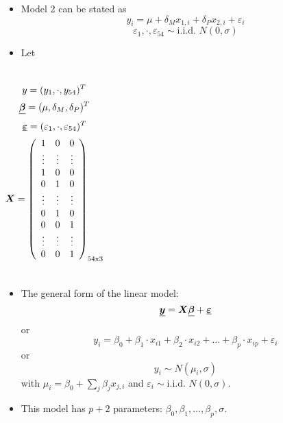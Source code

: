 \begin{frame}
  \begin{itemize}
    \item Model 2 can be stated as
      $$ y_i = \mu + \delta_M x_{1,i} + \delta_P x_{2,i} + \varepsilon_i $$
      $$ \varepsilon_1, \cdot, \varepsilon_{54} \sim \text{i.i.d. } N(0, \sigma) $$
    \item Let
  \end{itemize}
  \vspace{0.25cm}
  \begin{columns}[l]
      \vspace{0.5cm}
      $$ \boldsymbol{\underline{}}y = (y_1, \cdot, y_{54})^T $$
      $$ \boldsymbol{\underline{\beta}} = (\mu, \delta_M, \delta_P)^T $$
      $$ \boldsymbol{\underline{\varepsilon}} = (\varepsilon_1, \cdot, \varepsilon_{54})^T $$
      \vspace{-1cm}   
      $$ 
        \boldsymbol{X} = 
       \left(
          \begin{array}{ccc} 
            1 & 0 & 0 \\
            \vdots & \vdots & \vdots \\
            1 & 0 & 0 \\
            0 & 1 & 0 \\
            \vdots & \vdots & \vdots \\
            0 & 1 & 0 \\
            0 & 0 & 1 \\
            \vdots & \vdots & \vdots \\
            0 & 0 & 1 \\  
          \end{array}
        \right)_{54\text{x}3}
      $$
  \end{columns}
\end{frame}




\begin{frame}
  \begin{itemize}
    \vspace{0.5cm}
    \item The general form of the linear model:
      $$ \boldsymbol{\underline{y}} = \boldsymbol{X} \boldsymbol{\underline{\beta}} + \boldsymbol{\underline{\varepsilon}} $$
      or    
      $$ y_i = \beta_0 + \beta_1 \cdot x_{i1} + \beta_2 \cdot x_{i2} + \dots + \beta_p \cdot x_{ip} + \varepsilon_i $$
      or
      $$ y_i \sim N(\mu_i, \sigma) $$
      with $ \mu_i = \beta_0 + \sum_j \beta_j x_{j,i} $ and $ \varepsilon_i \sim \text{i.i.d. } N(0, \sigma) $.
    \vspace{0.5cm}
    \item This model has $ p +2 $ parameters: $ \beta_0, \beta_1, \dots, \beta_p, \sigma $.
  \end{itemize}
\end{frame}

